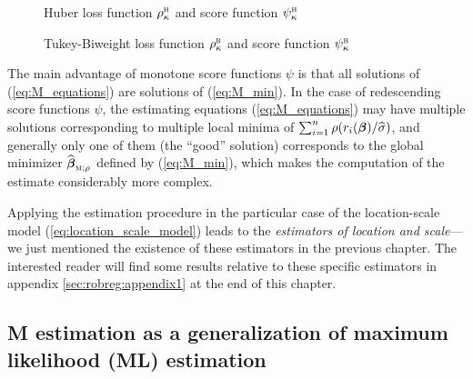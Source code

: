 \begin{figure}[h!]
    \centering
    \caption{Huber loss function $\rho_{\kappa}^{\stsc{H}}$ and score function $\psi_{\kappa}^{\stsc{H}}$}
    \label{fig:rho_psi_Huber}
\end{figure}

\begin{figure}[h!]
    \centering
    \caption{Tukey-Biweight loss function $\rho_{\kappa}^{\stsc{B}}$ and score function $\psi_{\kappa}^{\stsc{B}}$}
    \label{fig:rho_psi_Biweight}
\end{figure}

The main advantage of monotone score functions $\psi$ is that all solutions of
(\ref{eq:M_equations}) are solutions of (\ref{eq:M_min}). In the case of
redescending score functions $\psi$, the estimating equations
(\ref{eq:M_equations}) may have multiple solutions corresponding to multiple
local minima of $\sum_{i=1}^{n}\rho(r_{i}(\boldsymbol\beta)/\widehat{\sigma})$,
and generally only one of them (the “good” solution) corresponds to the global
minimizer $\sthat{\boldsymbol\beta}_{\stsc{M};\rho}$ defined by
(\ref{eq:M_min}), which makes the computation of the  estimate
considerably more complex.

\begin{stremark}
Applying the  estimation procedure in the particular case of the
location-scale model (\ref{eq:location_scale_model}) leads to the 
\emph{estimators of location and scale}---we just mentioned the existence of
these estimators in the previous chapter. The interested reader will find some
results relative to these specific estimators in appendix
\ref{sec:robreg:appendix1} at the end of this chapter.
\end{stremark}

\subsection{M estimation as a generalization of maximum likelihood (ML) estimation}

